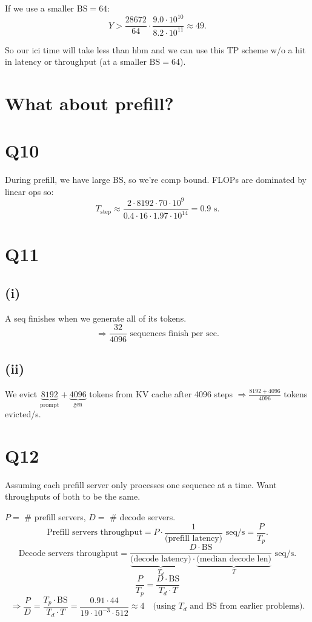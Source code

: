 \documentclass[11pt]{article}
\newcommand{\Tstep}{T_{\text{step}}}
\begin{document}
If we use a smaller $\text{BS} = 64$:
\[
Y > \frac{28672}{64} \cdot \frac{9.0 \cdot 10^{10}}{8.2 \cdot 10^{11}} \approx 49.
\]

So our ici time will take less than hbm and we can use this TP scheme w/o a hit in latency or throughput (at a smaller $\text{BS} = 64$).

\section*{What about prefill?}

\section*{Q10}

During prefill, we have large BS, so we're comp bound. FLOPs are dominated by linear ops so:
\[
\Tstep \approx \frac{2 \cdot 8192 \cdot 70 \cdot 10^9}{0.4 \cdot 16 \cdot 1.97 \cdot 10^{14}} = 0.9 \text{ s.}
\]

\section*{Q11}

\subsection*{(i)}

A seq finishes when we generate all of its tokens.
\[
\Rightarrow \frac{32}{4096} \text{ sequences finish per sec.}
\]

\subsection*{(ii)}

We evict $\underbrace{8192}_{\text{prompt}} + \underbrace{4096}_{\text{gen}}$ tokens from KV cache after 4096 steps $\Rightarrow \frac{8192 + 4096}{4096}$ tokens evicted/s.

\section*{Q12}

Assuming each prefill server only processes one sequence at a time. Want throughputs of both to be the same.

$P = $ \# prefill servers, $D = $ \# decode servers.
\[
\text{Prefill servers throughput} = P \cdot \frac{1}{\text{(prefill latency)}} \text{ seq/s} = \frac{P}{T_p}.
\]
\[
\text{Decode servers throughput} = \frac{D \cdot \text{BS}}{\underbrace{\text{(decode latency)}}_{T_d} \cdot \underbrace{\text{(median decode len)}}_{T}} \text{ seq/s}.
\]
\[
\frac{P}{T_p} = \frac{D \cdot \text{BS}}{T_d \cdot T}
\]
\[
\Rightarrow \frac{P}{D} = \frac{T_p \cdot \text{BS}}{T_d \cdot T} = \frac{0.91 \cdot 44}{19 \cdot 10^{-3} \cdot 512} \approx 4 \quad \text{(using $T_d$ and BS from earlier problems).}
\]
\end{document}
